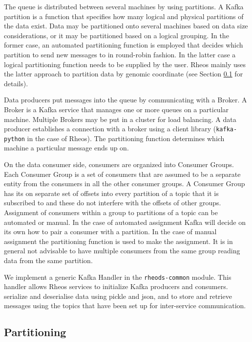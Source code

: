 The queue is distributed between several machines by using partitions. A Kafka partition is a function that specifies how many logical and physical partitions of the data exist. Data may be partitioned onto several machines based on data size considerations, or it may be partitioned based on a logical grouping. In the former case, an automated partitioning function is employed that decides which partition to send new messages to in round-robin fashion. In the latter case a logical partitioning function needs to be supplied by the user. Rheos mainly uses the latter approach to partition data by genomic coordinate (see Section \ref{sec:main_body_partitioning} for details).

Data producers put messages into the queue by communicating with a Broker. A Broker is a Kafka service that manages one or more queues on a particular machine. Multiple Brokers may be put in a cluster for load balancing. A data producer establishes a connection with a broker using a client library (\texttt{kafka-python} in the case of Rheos). The partitioning function determines which machine a particular message ends up on.

On the data consumer side, consumers are organized into Consumer Groups. Each Consumer Group is a set of consumers that are assumed to be a separate entity from the consumers in all the other consumer groups. A Consumer Group has its on separate set of offsets into every partition of a topic that it is subscribed to and these do not interfere with the offsets of other groups. Assignment of consumers within a group to partitions of a topic can be automated or manual. In the case of automated assignment Kafka will decide on its own how to pair a consumer with a partition. In the case of manual assignment the partitioning function is used to make the assignment. It is in general not advisable to have multiple consumers from the same group reading data from the same partition. 

We implement a generic Kafka Handler in the \texttt{rheods-common} module. This handler allows Rheos services to initialize Kafka producers and consumers. serialize and deserialise data using pickle and json, and to store and retrieve messages using the topics that have been set up for inter-service communication.

\subsection{Partitioning} \label{sec:main_body_partitioning}

